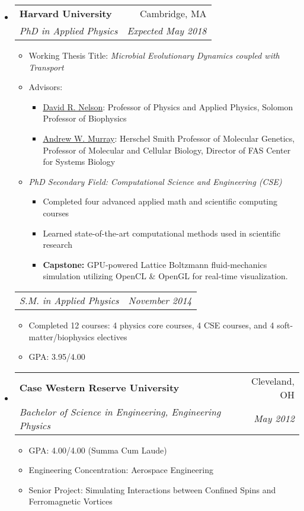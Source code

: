 \documentclass[letterpaper,11pt]{article}
\makeatletter
\newcommand{\resitem}[1]{\item #1 \vspace{-2pt}}
\newcommand{\ressubheading}[4]{\vspace{-14pt}
\begin{tabular*}{7.0in}{l@{\extracolsep{\fill}}r}
                \\
                \textbf{#1} & #2 \\
                \textit{#3} & \textit{#4} \\
\end{tabular*}\vspace{-6pt}}
\newcommand{\resbelowsubheading}[2]{\vspace{-14pt}
\begin{tabular*}{7.0in}{l@{\extracolsep{\fill}}r}
                \\
                \textit{#1} & \textit{#2} \\
\end{tabular*}\vspace{-6pt}}
\makeatother
\begin{document}
\begin{itemize}
\item
        \ressubheading{Harvard University}{Cambridge, MA}{PhD in Applied Physics}{Expected May 2018}     
        \begin{itemize}
                \resitem{Working Thesis Title: \textit{Microbial Evolutionary Dynamics coupled with Transport}}
                \resitem{Advisors:}
                \begin{itemize}
                        \resitem{\href{http://www.seas.harvard.edu/directory/nelson}{David R. Nelson}: Professor of Physics and Applied Physics, Solomon Professor of Biophysics}
                \resitem{\href{https://www.mcb.harvard.edu/mcb/faculty/profile/andrew-w-murray/}{Andrew W. Murray}: Herschel Smith Professor of Molecular Genetics,
Professor of Molecular and Cellular Biology,
Director of FAS Center for Systems Biology}
                \end{itemize}           
                \resitem{\emph{PhD Secondary Field: Computational Science and Engineering (CSE)}}         
                \begin{itemize}
                        \resitem{Completed four advanced applied math and scientific computing courses}
                        \resitem{Learned state-of-the-art computational methods used in scientific research}
                        \resitem{\textbf{Capstone:} GPU-powered Lattice Boltzmann fluid-mechanics simulation utilizing OpenCL \& OpenGL for real-time visualization.  }
                \end{itemize}                   
        \end{itemize}

\resbelowsubheading{S.M. in Applied Physics}{November 2014}
        \begin{itemize}
        \resitem{Completed 12 courses: 4 physics core courses, 4 CSE courses, and 4 soft-matter/biophysics electives}
        \resitem{GPA: 3.95/4.00}
        \end{itemize}
\item
        \ressubheading{Case Western Reserve University}{Cleveland, OH}{Bachelor of Science in Engineering, Engineering Physics}{May 2012}
        \begin{itemize}
                \resitem{GPA: 4.00/4.00 (Summa Cum Laude)}
                \resitem{Engineering Concentration: Aerospace Engineering}
                \resitem{Senior Project: Simulating Interactions between Confined Spins and Ferromagnetic Vortices}
        \end{itemize}
\end{itemize}
\end{document}
